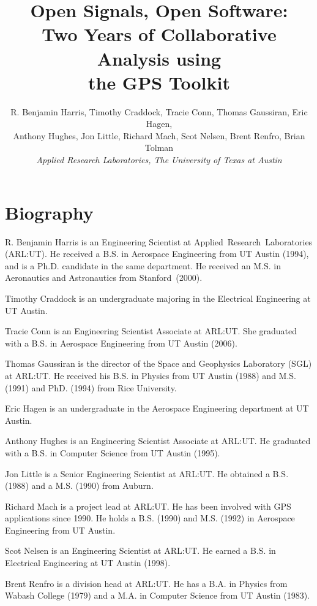\documentclass{ion-gps}
\title{\huge\bf Open Signals, Open Software:\\
                Two Years of Collaborative Analysis using \\
                the GPS Toolkit }
\author{R. Benjamin Harris, Timothy Craddock, Tracie Conn, Thomas Gaussiran, 
        Eric Hagen, \\
        Anthony Hughes, Jon Little, Richard Mach, Scot Nelsen, 
        Brent Renfro, Brian Tolman\\ 
        \it{Applied Research Laboratories, The University of Texas at Austin}}
\date{}
\begin{document}
\def\figurename{Fig.}
\def\tablename{Table}

\pagestyle{plain} %

\maketitle

\thispagestyle{empty} %

\section*{Biography}

R. Benjamin Harris is an Engineering Scientist at \mbox{Applied Research
Laboratories} (ARL:UT). He received a B.S. in Aerospace Engineering from UT Austin (1994), and is a Ph.D. candidate in the same department. He received an M.S. in Aeronautics and Astronautics from \mbox{Stanford (2000)}.

Timothy Craddock is an undergraduate majoring in the Electrical
Engineering at UT Austin.

Tracie Conn is an Engineering Scientist Associate at ARL:UT. She
graduated with a B.S. in Aerospace Engineering from UT Austin (2006).

Thomas Gaussiran is the director of the Space and Geophysics Laboratory
(SGL) at ARL:UT. He received his B.S. in Physics from UT Austin (1988)
and M.S. (1991) and PhD. (1994) from Rice University.

Eric Hagen is an undergraduate in the Aerospace Engineering department
at UT Austin.

Anthony Hughes is an Engineering Scientist Associate at ARL:UT. He
graduated with a B.S. in Computer Science from UT Austin (1995).

Jon Little is a Senior Engineering Scientist at ARL:UT. He obtained a
B.S. (1988) and a M.S. (1990) from Auburn.

Richard Mach is a project lead at ARL:UT.  He has been involved with
GPS applications since 1990.  He holds a B.S. (1990) and M.S. (1992) in Aerospace
Engineering from UT Austin.

Scot Nelsen is an Engineering Scientist at ARL:UT. He earned a B.S. in
Electrical Engineering at UT Austin (1998).

Brent Renfro is a division head at ARL:UT. He has a B.A. in Physics
from Wabash College (1979) and a M.A. in Computer Science from UT
Austin (1983).
\end{document}
